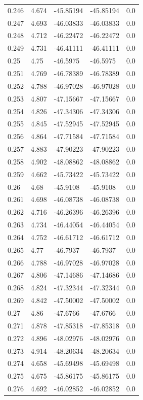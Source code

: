 \begin{tabular}{lllll}
0.246 & 4.674 & -45.85194 & -45.85194 & 0.0 \\
0.247 & 4.693 & -46.03833 & -46.03833 & 0.0 \\
0.248 & 4.712 & -46.22472 & -46.22472 & 0.0 \\
0.249 & 4.731 & -46.41111 & -46.41111 & 0.0 \\
0.25 & 4.75 & -46.5975 & -46.5975 & 0.0 \\
0.251 & 4.769 & -46.78389 & -46.78389 & 0.0 \\
0.252 & 4.788 & -46.97028 & -46.97028 & 0.0 \\
0.253 & 4.807 & -47.15667 & -47.15667 & 0.0 \\
0.254 & 4.826 & -47.34306 & -47.34306 & 0.0 \\
0.255 & 4.845 & -47.52945 & -47.52945 & 0.0 \\
0.256 & 4.864 & -47.71584 & -47.71584 & 0.0 \\
0.257 & 4.883 & -47.90223 & -47.90223 & 0.0 \\
0.258 & 4.902 & -48.08862 & -48.08862 & 0.0 \\
0.259 & 4.662 & -45.73422 & -45.73422 & 0.0 \\
0.26 & 4.68 & -45.9108 & -45.9108 & 0.0 \\
0.261 & 4.698 & -46.08738 & -46.08738 & 0.0 \\
0.262 & 4.716 & -46.26396 & -46.26396 & 0.0 \\
0.263 & 4.734 & -46.44054 & -46.44054 & 0.0 \\
0.264 & 4.752 & -46.61712 & -46.61712 & 0.0 \\
0.265 & 4.77 & -46.7937 & -46.7937 & 0.0 \\
0.266 & 4.788 & -46.97028 & -46.97028 & 0.0 \\
0.267 & 4.806 & -47.14686 & -47.14686 & 0.0 \\
0.268 & 4.824 & -47.32344 & -47.32344 & 0.0 \\
0.269 & 4.842 & -47.50002 & -47.50002 & 0.0 \\
0.27 & 4.86 & -47.6766 & -47.6766 & 0.0 \\
0.271 & 4.878 & -47.85318 & -47.85318 & 0.0 \\
0.272 & 4.896 & -48.02976 & -48.02976 & 0.0 \\
0.273 & 4.914 & -48.20634 & -48.20634 & 0.0 \\
0.274 & 4.658 & -45.69498 & -45.69498 & 0.0 \\
0.275 & 4.675 & -45.86175 & -45.86175 & 0.0 \\
0.276 & 4.692 & -46.02852 & -46.02852 & 0.0 \\

\end{tabular}
